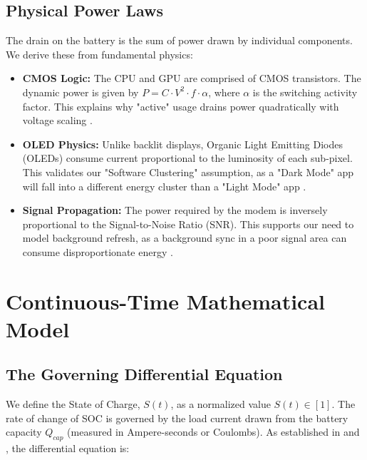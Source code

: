 \documentclass[12pt]{article}
\begin{document}
\subsection{Physical Power Laws}

The drain on the battery is the sum of power drawn by individual components. We derive these from fundamental physics:
\begin{itemize}
    \item \textbf{CMOS Logic:} The CPU and GPU are comprised of CMOS transistors. The dynamic power is given by $P = C \cdot V^2 \cdot f \cdot \alpha$, where $\alpha$ is the switching activity factor. This explains why "active" usage drains power quadratically with voltage scaling \cite{1}.
    \item \textbf{OLED Physics:} Unlike backlit displays, Organic Light Emitting Diodes (OLEDs) consume current proportional to the luminosity of each sub-pixel. This validates our "Software Clustering" assumption, as a "Dark Mode" app will fall into a different energy cluster than a "Light Mode" app \cite{2, 5}.
    \item \textbf{Signal Propagation:} The power required by the modem is inversely proportional to the Signal-to-Noise Ratio (SNR). This supports our need to model background refresh, as a background sync in a poor signal area can consume disproportionate energy \cite{13}.
\end{itemize}

\newpage


\section{Continuous-Time Mathematical Model}

\subsection{The Governing Differential Equation}

We define the State of Charge, $S(t)$, as a normalized value $S(t) \in [1]$. The rate of change of SOC is governed by the load current drawn from the battery capacity $Q_{cap}$ (measured in Ampere-seconds or Coulombs). As established in \cite{6} and \cite{9}, the differential equation is:
\end{document}
